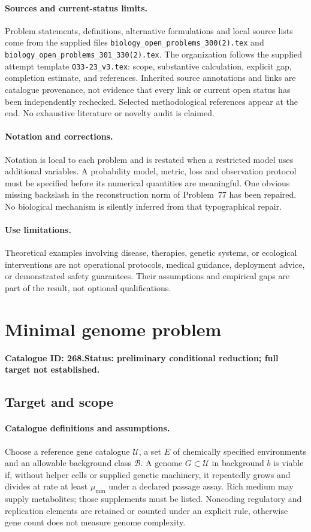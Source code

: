 \documentclass[11pt]{article}
\begin{document}
\paragraph{Sources and current-status limits.}
Problem statements, definitions, alternative formulations and local source lists
come from the supplied files
\texttt{biology\_open\_problems\_300(2).tex} and
\texttt{biology\_open\_problems\_301\_330(2).tex}.
The organization follows the supplied attempt template
\texttt{O33-23\_v3.tex}: scope, substantive calculation, explicit gap,
completion estimate, and references. Inherited source annotations and links are
catalogue provenance, not evidence that every link or current open status has
been independently rechecked. Selected methodological references appear at the
end. No exhaustive literature or novelty audit is claimed.

\paragraph{Notation and corrections.}
Notation is local to each problem and is restated when a restricted model uses
additional variables. A probability model, metric, loss and observation protocol
must be specified before its numerical quantities are meaningful. One obvious
missing backslash in the reconstruction norm of Problem~77 has been repaired.
No biological mechanism is silently inferred from that typographical repair.

\paragraph{Use limitations.}
Theoretical examples involving disease, therapies, genetic systems, or ecological
interventions are not operational protocols, medical guidance, deployment advice,
or demonstrated safety guarantees. Their assumptions and empirical gaps are part
of the result, not optional qualifications.

\setcounter{section}{267}
\section{Minimal genome problem}
\label{prob:268}
\noindent\textbf{Catalogue ID: 268.}\quad \textbf{Status: preliminary conditional reduction; full target not established.}
\subsection{Target and scope}
\paragraph{Catalogue definitions and assumptions.}
Choose a reference gene catalogue $\mathcal U$, a set $E$ of chemically specified environments and an allowable background class $\mathcal B$. A genome $G\subset\mathcal U$ in background $b$ is viable if, without helper cells or supplied genetic machinery, it repeatedly grows and divides at rate at least $\mu_{\min}$ under a declared passage assay. Rich medium may supply metabolites; those supplements must be listed. Noncoding regulatory and replication elements are retained or counted under an explicit rule, otherwise gene count does not measure genome complexity.
\end{document}
